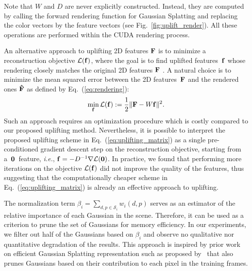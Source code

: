 Note that $W$ and $D$ are never explicitly constructed. Instead, they are computed by calling the forward rendering function for Gaussian Splatting and replacing the color vectors by the feature vectors (see Fig.~\ref{fig:uplift_render}). All these operations are performed within the CUDA rendering process.

An alternative approach to uplifting 2D features ${\bf F}$ is to minimize a reconstruction objective $\mathcal{L}({\bf f})$, where the goal is to find uplifted features~${\bf f}$ whose rendering closely matches the original 2D features ${\bf F}$ \citep{tschernezki2022n3f, kerr2023lerf, zuo2024fmgs}. A natural choice is to minimize the mean squared error between the 2D features~${\bf F}$ and the rendered ones ${\bf \hat{F}}$ as defined by Eq.~(\ref{eq:rendering}):
\begin{align}
\min_{{\bf f}} \mathcal{L}({\bf f}) := \frac{1}{2}\Vert {\bf F} - W{\bf f} \Vert^2.
\label{eq:reconstruction_loss}
\end{align}
Such an approach requires an optimization procedure which is costly compared to our proposed uplifting method. Nevertheless, it is possible to interpret the proposed uplifting scheme in Eq.~(\ref{eq:uplifting_matrix}) as a single pre-conditioned gradient descent step on the reconstruction objective, starting from a~${\bf 0}$~feature, \emph{i.e.}, ${\bf f}= -D^{-1}\nabla \mathcal{L}({\bf 0})$. In practice, we found that performing more iterations on the objective $\mathcal{L}({\bf f})$ did not improve the quality of the features, thus suggesting that the computationally cheaper scheme in Eq.~(\ref{eq:uplifting_matrix}) is already an effective approach to uplifting.

The normalization term $\beta_i = \sum_{d,p\in \mathcal{S}_i} w_{i}(d, p)$ serves as an estimator of the relative importance of each Gaussian in the scene. Therefore, it can be used as a criterion to prune the set of Gaussians for memory efficiency. In our experiments, we filter out half of the Gaussians based on $\beta_i$ and observe no qualitative nor quantitative degradation of the results. This approach is inspired by prior work on efficient Gaussian Splatting representation such as proposed by~\cite{fan2023lightgaussian} that also prunes Gaussians based on their contribution to each pixel in the training frames.  


